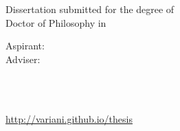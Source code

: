 \begin{titlepage}

  
	\begin{addmargin}[-1cm]{-3cm}
    \begin{center}
        \large  

        \hfill

        \vfill
        
        \begingroup
            \spacedallcaps{\myTitleOne} \\
            \spacedallcaps{\myTitleTwo} \\  
            \bigskip
        \endgroup
        
        \bigskip
        Dissertation submitted for the degree of \\
        Doctor of Philosophy in \myProgram
        
        \bigskip
        Aspirant: \myName \\
        Adviser: \myProf \\
        
        \vfill


        \myDepartment \\                            
        \myUni \\ \bigskip
        
        \href{http://variani.github.io/thesis}{http://variani.github.io/thesis} \\
        \myTime

        \vfill                      

    \end{center}  
  \end{addmargin}       
\end{titlepage}   
